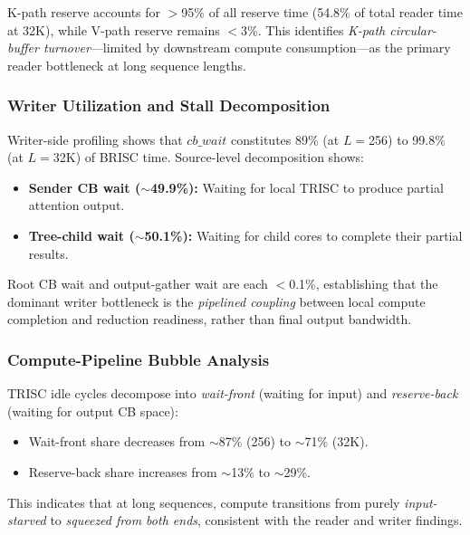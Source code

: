 \documentclass[sigconf, review, anonymous]{acmart}
\begin{document}
K-path reserve accounts for $>$95\% of all reserve time (54.8\% of
total reader time at 32K), while V-path reserve remains $<$3\%.
This identifies \emph{K-path circular-buffer turnover}---limited by
downstream compute consumption---as the primary reader bottleneck at
long sequence lengths.



\subsubsection{Writer Utilization and Stall Decomposition}\label{sec:eval-writer}

Writer-side profiling shows that $cb\_wait$ constitutes 89\% (at
$L{=}$256) to 99.8\% (at $L{=}$32K) of BRISC time.  Source-level
decomposition shows:
\begin{itemize}
  \item \textbf{Sender CB wait ($\sim$49.9\%):} Waiting for local
    TRISC to produce partial attention output.
  \item \textbf{Tree-child wait ($\sim$50.1\%):} Waiting for child
    cores to complete their partial results.
\end{itemize}
Root CB wait and output-gather wait are each $<$0.1\%, establishing
that the dominant writer bottleneck is the \emph{pipelined coupling}
between local compute completion and reduction readiness, rather than
final output bandwidth.



\subsubsection{Compute-Pipeline Bubble Analysis}\label{sec:eval-compute}

TRISC idle cycles decompose into \emph{wait-front} (waiting for input)
and \emph{reserve-back} (waiting for output CB space):
\begin{itemize}
  \item Wait-front share decreases from $\sim$87\% (256) to
    $\sim$71\% (32K).
  \item Reserve-back share increases from $\sim$13\% to $\sim$29\%.
\end{itemize}
This indicates that at long sequences, compute transitions from
purely \emph{input-starved} to \emph{squeezed from both ends},
consistent with the reader and writer findings.


\end{document}

